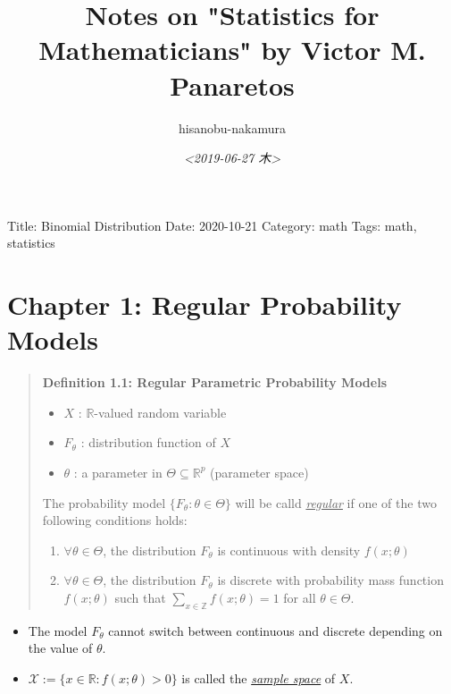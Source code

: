\documentclass{article}
\author{hisanobu-nakamura}
\date{\textit{<2019-06-27 木>}}
\title{Notes on "Statistics for Mathematicians" by Victor M. Panaretos}
\begin{document}
\maketitle
Title: Binomial Distribution
Date: 2020-10-21
Category: math
Tags: math, statistics


\section{Chapter 1: Regular Probability Models}
\label{sec-1}

\begin{quote}
\textbf{Definition 1.1: Regular Parametric Probability Models}\\
\begin{itemize}
\item $X$ : $\mathbb{R}$-valued random variable
\item $F_{\theta}$ : distribution function of $X$
\item $\theta$ : a parameter in $\Theta \subseteq \mathbb{R}^{p}$ (parameter space)
\end{itemize}

The probability model $\{F_{\theta} : \theta \in \Theta\}$ will be calld \emph{\uline{regular}} if one of the two following conditions holds:

\begin{enumerate}
\item $\forall \theta  \in \Theta$, the distribution $F_{\theta}$ is continuous with density $f(x; \theta)$
\item $\forall \theta  \in \Theta$, the distribution $F_{\theta}$ is discrete with probability mass function $f(x;\theta)$ such that $\sum_{x \in \mathbb{Z}} f(x;\theta) = 1$ for all $\theta \in \Theta$.
\end{enumerate}
\end{quote}

\begin{itemize}
\item The model $F_{\theta}$ cannot switch between continuous and discrete depending on the value of $\theta$.
\item $\mathcal{X} := \{x \in \mathbb{R}: f(x;\theta) > 0 \}$ is called the \emph{\uline{sample space}} of $X$.
\end{itemize}
\end{document}
